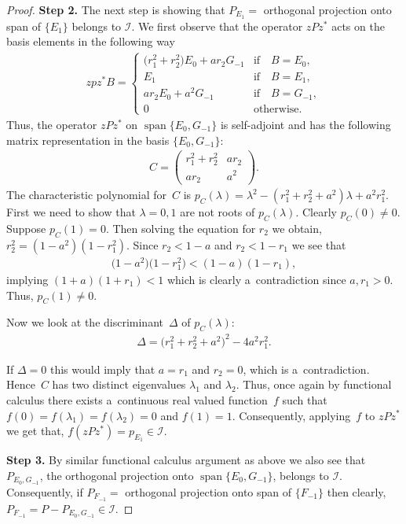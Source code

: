 \documentclass[11pt]{article}
\numberwithin{equation}{section}
\begin{document}
\begin{proof}
{\bf Step 2.} The next step is showing that $P_{E_1}=$ orthogonal projection onto span of $\{E_1\}$ belongs to $\mathcal I$.
We f\/irst observe that the operator $zPz^*$ acts on the basis elements in the following way
\begin{gather*}
zpz^* B=
\begin{cases}
\big(r_1^2+r_2^2\big)E_0+ar_2G_{-1} & \text{if}\quad  B=E_0,
\\
E_1 & \text{if}\quad  B=E_1,
\\
ar_2E_0+a^2 G_{-1} & \text{if}\quad  B=G_{-1},
\\
0 & \text{otherwise}.
\end{cases}
\end{gather*}
Thus, the operator $zPz^*$ on $\operatorname{span}\{E_0, G_{-1}\}$ is self-adjoint and has the following matrix representation in the
basis $\{E_0, G_{-1}\}$:
\begin{gather*}
C=\left(
\begin{matrix}
r_1^2+r_2^2 & ar_2
\\
ar_2 & a^2
\end{matrix}
\right).
\end{gather*}
The characteristic polynomial for~$C$ is $p_C(\lambda)=\lambda^2-(r_1^2+r_2^2+a^2)\lambda+a^2r_1^2$.
First we need to show that $\lambda=0,1$ are not roots of $p_C(\lambda)$.
Clearly $p_C(0) \neq 0$.
Suppose $p_C(1)=0$.
Then solving the equation for $r_2$ we obtain, $r_2^2=(1-a^2)(1-r_1^2)$.
Since $r_2 < 1-a$ and $r_2 < 1-r_1$ we see that
\begin{gather*}
\big(1-a^2\big)\big(1-r_1^2\big) < (1-a)(1-r_1),
\end{gather*}
implying $(1+a)(1+r_1)<1$ which is clearly a~contradiction since $a, r_1 >0$.
Thus, $p_C(1)\neq 0$.

Now we look at the discriminant~$\Delta$ of $p_C(\lambda)$:
\begin{gather*}
\Delta=\big(r_1^2+r_2^2+a^2\big)^2-4a^2r_1^2.
\end{gather*}

If $\Delta=0$ this would imply that $a=r_1$ and $r_2=0$, which is a~contradiction.
Hence~$C$ has two distinct eigenvalues $\lambda_1$ and $\lambda_2$.
Thus, once again by functional calculus there exists a~continuous real valued function~$f$ such that $f(0)=
f(\lambda_1)=f(\lambda_2)=0$ and $f(1)=1$.
Consequently, applying~$f$ to $zPz^*$ we get that, $f(zPz^*)= p_{E_1} \in \mathcal I$.

{\bf Step 3.} By similar functional calculus argument as above we also see that $P_{E_0, G_{-1}}$, the orthogonal
projection onto $\operatorname{span}\{E_0, G_{-1}\}$, belongs to $\mathcal I$.
Consequently, if $P_{F_{-1}}=$ orthogonal projection onto span of $\{F_{-1}\}$ then clearly, $P_{F_{-1}}= P- P_{E_0,
G_{-1}} \in \mathcal I$.


\end{proof}
\end{document}

